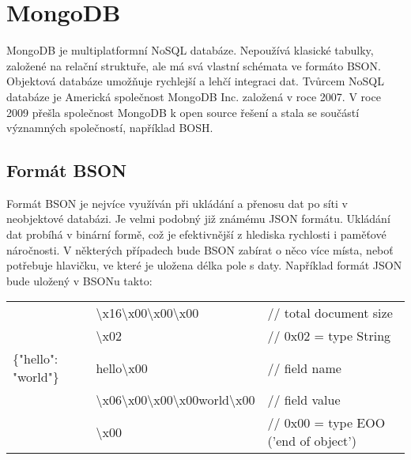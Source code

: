 \section {MongoDB}
\par MongoDB je multiplatformní NoSQL databáze. Nepoužívá klasické tabulky, založené na relační struktuře, ale má svá vlastní schémata ve formáto BSON. Objektová databáze umožňuje rychlejší a lehčí integraci dat. Tvůrcem NoSQL databáze je Americká společnost MongoDB Inc. založená v roce 2007. V roce 2009 přešla společnost MongoDB k open source řešení a stala se součástí významných společností, například BOSH.
\subsection {Formát BSON}
\par Formát BSON je nejvíce využíván při ukládání a přenosu dat po síti v neobjektové databázi. Je velmi podobný již známému JSON formátu. Ukládání dat probíhá v binární formě, což je efektivnější z hlediska rychlosti i paměťové náročnosti. V některých případech bude BSON zabírat o něco více místa, neboť potřebuje hlavičku, ve které je uložena délka pole s daty.
Například formát JSON bude uložený v BSONu takto: \newline
\begin{tabular}{ l l l }
 						& \textbackslash{x}16\textbackslash{x}00\textbackslash{x}00\textbackslash{x}00 								&// total document size \\
 						& \textbackslash{x}02 																						&// 0x02 = type String\\
\{"hello": "world"\} 	& hello\textbackslash{x}00 																					&// field name\\
 						& \textbackslash{x}06\textbackslash{x}00\textbackslash{x}00\textbackslash{x}00world\textbackslash{x}00 		&// field value\\
 						& \textbackslash{x}00 																						&// 0x00 = type EOO ('end of object')\\
\end{tabular}



                   
  
  
